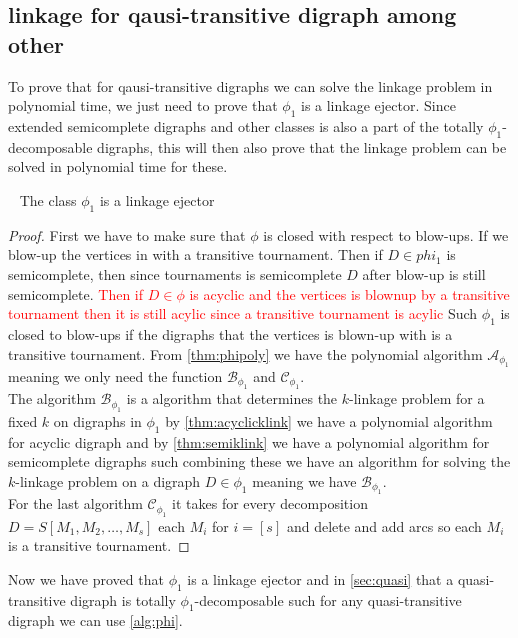 \subsection{linkage for qausi-transitive digraph among other}
To prove that for qausi-transitive digraphs we can solve the linkage problem in polynomial time, we just need to prove that $\phi_1$ is a linkage ejector. 
Since extended semicomplete digraphs and other classes is also a part of the totally $\phi_1$-decomposable digraphs, this will then also prove that the linkage problem can be solved in polynomial time for these.

\begin{lemma}~\cite{bangJGT85}
    The class $\phi_1$ is a linkage ejector
    \label{thm:phi1ejector}
\end{lemma}
\begin{proof}
    First we have to make sure that $\phi$ is closed with respect to blow-ups. 
    If we blow-up the vertices in with a transitive tournament.
    Then if $D\in phi_1$ is semicomplete, then since tournaments is semicomplete $D$ after blow-up is still semicomplete.
    \textcolor{red}{Then if $D\in \phi$ is acyclic and the vertices is blownup by a transitive tournament then it is still acylic since a transitive tournament is acylic} Such $\phi_1$ is closed to blow-ups if the digraphs that the vertices is blown-up with is a transitive tournament.
    From \autoref{thm:phipoly} we have the polynomial algorithm $\mathcal{A}_{\phi_1}$ meaning we only need the function $\mathcal{B}_{\phi_1}$ and $\mathcal{C}_{\phi_1}$.\\
    The algorithm $\mathcal{B}_{\phi_1}$ is a algorithm that determines the $k$-linkage problem for a fixed $k$ on digraphs in $\phi_1$ by \autoref{thm:acyclicklink} we have a polynomial algorithm for acyclic digraph and by \autoref{thm:semiklink} we have a polynomial algorithm for semicomplete digraphs such combining these we have an algorithm for solving the $k$-linkage problem on a digraph $D\in \phi_1$ meaning we have $\mathcal{B}_{\phi_1}$. \\
    For the last algorithm $\mathcal{C}_{\phi_1}$ it takes for every decomposition $D=S[M_1,M_2,\dots , M_s]$ each $M_i$ for $i=[s]$ and delete and add arcs so each $M_i$ is a transitive tournament.
\end{proof}

Now we have proved that $\phi_1$ is a linkage ejector and in \autoref{sec:quasi} that a quasi-transitive digraph is totally $\phi_1$-decomposable such for any quasi-transitive digraph we can use \autoref{alg:phi}.  